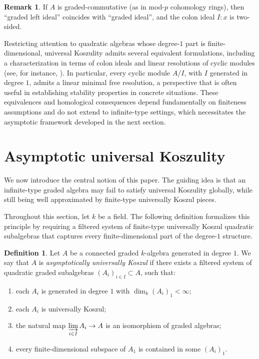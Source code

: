 \documentclass[11pt]{amsart}
\numberwithin{equation}{section}
\theoremstyle{definition}
\newtheorem{definition}[theorem]{Definition}
\newtheorem{remark}[theorem]{Remark}
\begin{document}
	
	\begin{remark}
		If \(A\) is graded-commutative (as in mod-\(p\) cohomology rings), then ``graded left ideal''	coincides with ``graded ideal'', and the colon ideal \(I:x\) is two-sided.
	\end{remark}
	
	
	
	
	Restricting attention to quadratic algebras whose degree-$1$ part is finite-dimensional, universal Koszulity admits several equivalent formulations, including a characterization in terms of colon ideals and linear resolutions of cyclic modules (see, for instance, \cite{PalaistiThesis}). In particular, every cyclic module \(A/I\), with \(I\) generated in degree \(1\), admits a linear minimal free resolution, a perspective that is often useful in establishing stability properties in concrete situations. These equivalences and homological consequences depend fundamentally on finiteness assumptions and do not extend to infinite-type settings, which necessitates the asymptotic framework developed in the next section.
	
	
	
	\section{Asymptotic universal Koszulity}
	
	We now introduce the central notion of this paper. The guiding idea is that an infinite-type graded algebra may fail to satisfy universal Koszulity globally, while still being well approximated by finite-type universally Koszul pieces.
	
	Throughout this section, let \(k\) be a field. The following definition formalizes this principle by requiring a filtered system of finite-type universally Koszul quadratic subalgebras that captures every finite-dimensional part of the degree-$1$ structure. 
	
	\begin{definition}\label{def:asymp}
		Let \(A\) be a connected graded $k$-algebra generated in degree \(1\). We say that \(A\) is \emph{asymptotically universally Koszul} if there exists a filtered system of quadratic graded subalgebras \( \displaystyle (A_i)_{i\in I}\subset A\), such that:
		\begin{enumerate}[label=(\roman*)]
			\item each \(A_i\) is generated in degree \(1\) with \(\dim_k (A_i)_1 < \infty\);
			\item each \(A_i\) is universally Koszul;
			\item the natural map \(\displaystyle \varinjlim_{i\in I} A_i \to A\) is an isomorphism of graded algebras;
			\item every finite-dimensional subspace of \(A_1\) is contained in some \((A_i)_1\).
		\end{enumerate}
	\end{definition}
	
\end{document}
